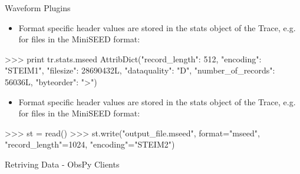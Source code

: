 \documentclass[handout]{beamer}
\begin{document}
\begin{frame}{Waveform Plugins}
    \begin{itemize}
        \item Format specific header values are stored in the stats object of the Trace, e.g. for files in the MiniSEED format:
    \end{itemize}
\begin{myColorBox}{0.95}{}
\begin{python}
>>> print tr.stats.mseed
AttribDict({"record_length": 512, "encoding": "STEIM1",
    "filesize": 28690432L, "dataquality": "D",
    "number_of_records": 56036L, "byteorder": ">"})
\end{python}
\end{myColorBox}

    \begin{itemize}
        \item Format specific header values are stored in the stats object of the Trace, e.g. for files in the MiniSEED format:
    \end{itemize}

\begin{myColorBox}{0.95}{}
\begin{python}
>>> st = read()
>>> st.write("output_file.mseed", format="mseed",
    "record_length"=1024, "encoding"="STEIM2")
\end{python}
\end{myColorBox}

\end{frame}


\begin{frame}{}
    \begin{center}
        \textcolor{lmu@darkgreen}{\LARGE{Retriving Data - ObsPy Clients}}
    \end{center}
\end{frame}
\end{document}

